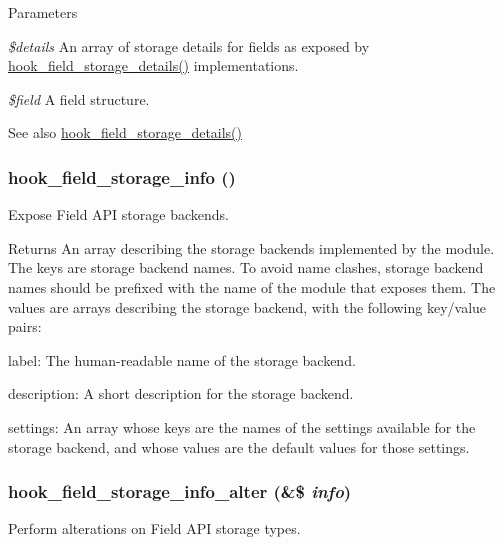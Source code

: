 \begin{DoxyParams}{Parameters}
\item[{\em \$details}]An array of storage details for fields as exposed by \hyperlink{group__field__storage_ga72b4d22502ffc709e50de0ba4f417062}{hook\_\-field\_\-storage\_\-details()} implementations. \item[{\em \$field}]A field structure.\end{DoxyParams}
\begin{DoxySeeAlso}{See also}
\hyperlink{group__field__storage_ga72b4d22502ffc709e50de0ba4f417062}{hook\_\-field\_\-storage\_\-details()} 
\end{DoxySeeAlso}
\hypertarget{group__field__storage_gadc5bfde3133504e946bb0aae8babe6f3}{
\subsubsection[{hook\_\-field\_\-storage\_\-info}]{\setlength{\rightskip}{0pt plus 5cm}hook\_\-field\_\-storage\_\-info ()}}
\label{group__field__storage_gadc5bfde3133504e946bb0aae8babe6f3}
Expose Field API storage backends.

\begin{DoxyReturn}{Returns}
An array describing the storage backends implemented by the module. The keys are storage backend names. To avoid name clashes, storage backend names should be prefixed with the name of the module that exposes them. The values are arrays describing the storage backend, with the following key/value pairs:
\begin{DoxyItemize}
\item label: The human-\/readable name of the storage backend.
\item description: A short description for the storage backend.
\item settings: An array whose keys are the names of the settings available for the storage backend, and whose values are the default values for those settings. 
\end{DoxyItemize}
\end{DoxyReturn}
\hypertarget{group__field__storage_ga98873f1aaac19188d739bf6cfcae468f}{
\subsubsection[{hook\_\-field\_\-storage\_\-info\_\-alter}]{\setlength{\rightskip}{0pt plus 5cm}hook\_\-field\_\-storage\_\-info\_\-alter (\&\$ {\em info})}}
\label{group__field__storage_ga98873f1aaac19188d739bf6cfcae468f}
Perform alterations on Field API storage types.


